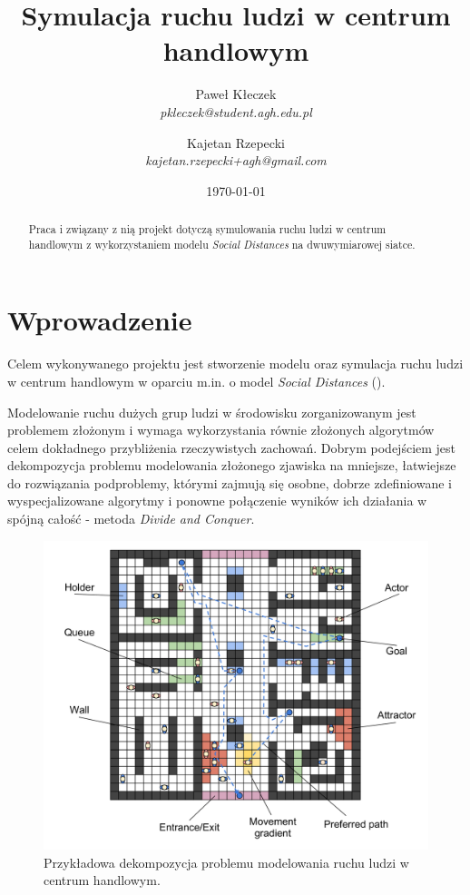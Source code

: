 \documentclass[a4paper, 12pt]{article}
\title{\textbf{Symulacja ruchu ludzi w centrum handlowym}}
\author{Paweł Kłeczek \\ \emph{pkleczek@student.agh.edu.pl} \and Kajetan Rzepecki \\ \emph{kajetan.rzepecki+agh@gmail.com}}
\date{\today}
\begin{document}
    \maketitle

    \vfill
    \begin{abstract}

\noindent
Praca i związany z nią projekt dotyczą symulowania ruchu ludzi w centrum handlowym z wykorzystaniem modelu \emph{Social Distances} na dwuwymiarowej siatce.
    \end{abstract}
    \vfill

    \thispagestyle{empty} %

\newpage
    \setcounter{page}{1}
    \setcounter{tocdepth}{3}

    \tableofcontents

\newpage
    \section{Wprowadzenie}
    \label{sec:intro}

\noindent
Celem wykonywanego projektu jest stworzenie modelu oraz symulacja ruchu ludzi w centrum handlowym w oparciu m.in. o model \emph{Social Distances} (\cite{refs:social-distances-1, refs:social-distances-2}).

Modelowanie ruchu dużych grup ludzi w środowisku zorganizowanym jest problemem złożonym i wymaga wykorzystania równie złożonych algorytmów celem dokładnego przybliżenia rzeczywistych zachowań. Dobrym podejściem jest dekompozycja problemu modelowania złożonego zjawiska na mniejsze, łatwiejsze do rozwiązania podproblemy, którymi zajmują się osobne, dobrze zdefiniowane i wyspecjalizowane algorytmy i ponowne połączenie wyników ich działania w spójną całość - metoda \emph{Divide and Conquer}.

    \begin{figure}[H]
        \centering
        \includegraphics[scale=0.3]{./img/Overview.pdf}
        \caption{Przykładowa dekompozycja problemu modelowania ruchu ludzi w centrum handlowym.}
        \label{fig:decomp}
    \end{figure}
\end{document}
